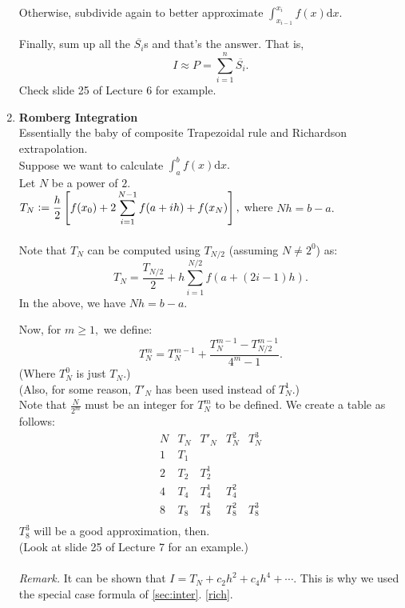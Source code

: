 \documentclass[12pt]{article}
\theoremstyle{definition}
\begin{document}
\begin{enumerate}
	Otherwise, subdivide again to better approximate $\displaystyle\int_{x_{i-1}}^{x_i} f(x) {\mathrm d}x.$

	Finally, sum up all the $\overline{S_i}$s and that's the answer. That is,
	\[I \approx P = \sum_{i=1}^{n}\overline{S_i}.\]
	Check slide 25 of Lecture 6 for example.
	\item \textbf{Romberg Integration}\\
	Essentially the baby of composite Trapezoidal rule and Richardson extrapolation.\\
	Suppose we want to calculate $\displaystyle\int_{a}^{b} f(x) {\mathrm d}x.$\\
	Let $N$ be a power of $2$.\\
	$T_N \vcentcolon= \dfrac{h}{2}\left[f(x_0) + 2\displaystyle\sum_{i=1}^{N-1}f(a + ih) + f(x_N)\right],$ where $Nh = b-a.$\\~\\
	Note that $T_N$ can be computed using $T_{N/2}$ (assuming $N \neq 2^0$) as:
	\[T_N = \frac{T_{N/2}}{2} + h\sum_{i=1}^{N/2}f\left(a + (2i - 1)h\right).\]
	In the above, we have $Nh = b - a.$ %

	Now, for $m \ge 1,$ we define:
	\[T^{m}_N = T^{m-1}_N + \frac{T^{m-1}_N - T^{m-1}_{N/2}}{4^m - 1}.\]
	(Where $T^{0}_N$ is just $T_N.$)\\
	(Also, for some reason, $T'_N$ has been used instead of $T^1_N$.)\\
	Note that $\frac{N}{2^m}$ must be an integer for $T^m_N$ to be defined.
	We create a table as follows:\\
		\[
		\begin{array}{c|c|c|c|c}
			N & T_N & T'_N & T^2_N & T^3_N\\
			\hline
			1 & T_1 & & &\\
			2 & T_2 & T^1_2 & & \\
			4 & T_4 & T^1_4 & T^2_4 & \\
			8 & T_8 & T^1_8 & T^2_8 & T^3_8 \\
		\end{array}
		\]
	$T^3_8$ will be a good approximation, then.\\
	(Look at slide 25 of Lecture 7 for an example.)\\~\\
	\emph{Remark.} It can be shown that $I = T_N + c_2h^2 + c_4h^4 + \cdots.$ This is why we used the special case formula of \ref{sec:inter}. \ref{rich}.
\end{enumerate}
\end{document}
